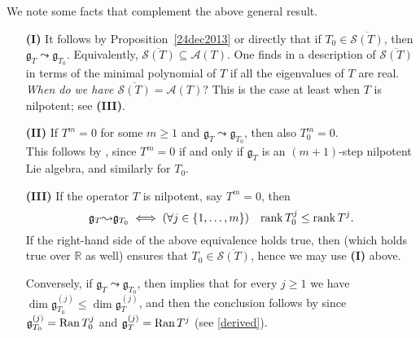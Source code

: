 \documentclass[
reqno]{amsart}
\begin{document}
\begin{remark}
\normalfont
We note some facts that complement the above general result. 

\begin{itemize}
\item[{\bf (I)}]\label{I} It follows by Proposition~\ref{24dec2013} or directly 
that if $T_0\in\overline{{{\mathcal S}}(T)}$, then ${{\mathfrak g}}_T{\leadsto}{{\mathfrak g}}_{T_0}$. 
Equivalently, $\overline{{{\mathcal S}}(T)}\subseteq{{\mathcal A}}(T)$.  
One finds in \cite[Th. 1.1]{BH79} a description of $\overline{{{\mathcal S}}(T)}$ 
in terms of the minimal polynomial of $T$ if all the eigenvalues of $T$ are real. 
\\ \emph{When do we have $\overline{{{\mathcal S}}(T)}={{\mathcal A}}(T)$}?  
This is the case at least when $T$ is nilpotent; see {\bf (III)}. 
  
\item[{\bf (II)}] If $T^m=0$ for some $m\ge 1$ and ${{\mathfrak g}}_T{\leadsto}{{\mathfrak g}}_{T_0}$, then also $T_0^m=0$. 
\\ This follows by \cite[Th. 1(14)]{NP06}, since $T^m=0$ if and only if 
${{\mathfrak g}}_T$ is an $(m+1)$-step nilpotent Lie algebra, and similarly for $T_0$. 

\item[{\bf (III)}] If the operator $T$ is nilpotent, say $T^m=0$, then  
$${{\mathfrak g}}_T{\leadsto}{{\mathfrak g}}_{T_0}\iff(\forall j\in\{1,\dots,m\})\quad {{\rm rank}\,} T_0^j\le{{\rm rank}\,} T^j.$$
If the right-hand side of the above equivalence holds true, 
then \cite[Prop. 3.1]{BH79} (which holds true over ${{\mathbb R}}$ as well) 
ensures that $T_0\in\overline{{{\mathcal S}}(T)}$, hence we may use {\bf (I)} above. 

Conversely, if ${{\mathfrak g}}_T{\leadsto}{{\mathfrak g}}_{T_0}$, then \cite[Th. 1(4)]{NP06} implies that 
for every $j\ge 1$ we have $\dim{{\mathfrak g}}_{T_0}^{(j)}\le\dim{{\mathfrak g}}_T^{(j)}$, 
and then the conclusion follows by since ${{\mathfrak g}}_{T_0}^{(j)}={{\rm Ran}\,} T_0^j$ 
and  ${{\mathfrak g}}_T^{(j)}={{\rm Ran}\,} T^j$ (see \eqref{derived}). 


\end{itemize}
\end{remark}
\end{document}
